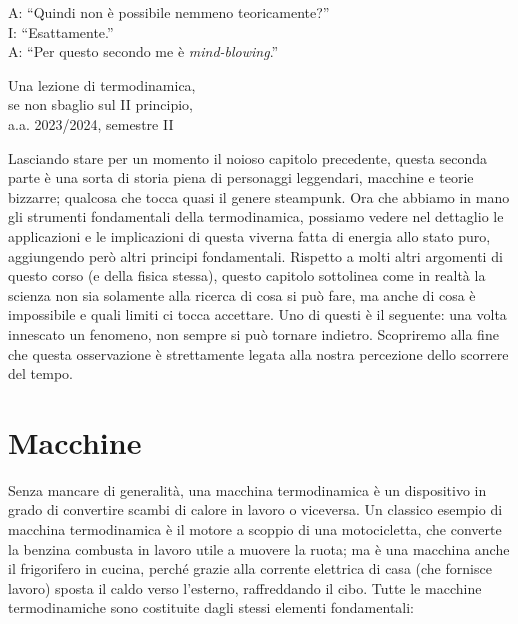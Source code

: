 \marginpar{\minitoc}

\epigraph{A: ``Quindi non è possibile nemmeno teoricamente?''\\I: ``Esattamente.''\\A: ``Per questo secondo me è \emph{mind-blowing}.''}{Una lezione di termodinamica,\\se non sbaglio sul II principio,\\a.a. 2023/2024, semestre II}

Lasciando stare per un momento il noioso capitolo precedente,
questa seconda parte è una sorta di storia piena di personaggi
leggendari, macchine e teorie bizzarre; qualcosa che tocca
quasi il genere steampunk. Ora che abbiamo in mano gli strumenti
fondamentali della termodinamica, possiamo vedere nel
dettaglio le applicazioni e le implicazioni di questa viverna
fatta di energia allo stato puro, aggiungendo però altri
principi fondamentali. Rispetto a molti altri
argomenti di questo corso (e della fisica stessa), questo
capitolo sottolinea come in realtà la scienza non sia
solamente alla ricerca di cosa si può fare, ma anche di
cosa è impossibile e quali limiti ci tocca accettare. Uno
di questi è il seguente: una
volta innescato un fenomeno, non sempre si può tornare indietro.
Scopriremo alla fine che questa osservazione è strettamente
legata alla nostra percezione dello scorrere del tempo.

\section{Macchine}
Senza mancare di generalità, una macchina termodinamica
è un dispositivo in grado di convertire scambi di calore
in lavoro o viceversa. Un classico esempio di macchina
termodinamica è il motore a scoppio di una motocicletta,
che converte la benzina combusta in lavoro utile a
muovere la ruota; ma è una macchina anche il frigorifero
in cucina, perché grazie alla corrente elettrica di
casa (che fornisce lavoro) sposta il caldo verso
l'esterno, raffreddando il cibo. Tutte le macchine
termodinamiche sono costituite dagli stessi elementi
fondamentali:

